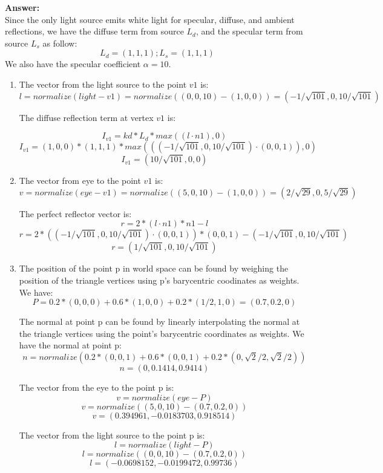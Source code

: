\documentclass[12pt]{letter}
\begin{document}
\begin{enumerate}
	\textbf{Answer:} \\
	Since the only light source emits white light for specular, diffuse, and ambient reflections, we have the diffuse term from source $L_d$, and the specular term from source $L_s$ as follow:
	$$ L_d = (1, 1, 1); L_s = (1, 1, 1) $$
	We also have the specular coefficient $\alpha = 10$.
	\begin{enumerate}
		\item
		The vector from the light source to the point $v1$ is:
		$$ l = normalize(light - v1) = normalize((0, 0, 10) - (1, 0, 0)) = (-1/\sqrt{101}, 0, 10/\sqrt{101})$$
		
		The diffuse reflection term at vertex $v1$ is:
		
		$$ I_{v1} = kd*L_d*max((l \cdot n1), 0)$$
		$$ I_{v1} = (1, 0, 0) * (1, 1, 1) * max(((-1/\sqrt{101}, 0, 10/\sqrt{101}) \cdot (0, 0, 1)), 0) $$
		$$ I_{v1} = (10/\sqrt{101}, 0, 0) $$
		
		\item
		The vector from eye to the point $v1$ is:
		$$ v = normalize(eye - v1) = normalize((5, 0, 10) - (1, 0, 0)) = (2/\sqrt{29}, 0, 5/\sqrt{29}) $$
		
		The perfect reflector vector is:
		$$ r = 2*(l \cdot n1)*n1 - l $$
		$$ r = 2*((-1/\sqrt{101}, 0, 10/\sqrt{101}) \cdot (0, 0, 1))*(0, 0, 1) - (-1/\sqrt{101}, 0, 10/\sqrt{101}) $$
		$$ r = (1/\sqrt{101}, 0, 10/\sqrt{101}) $$
		
		
		\item
	The position of the point p in world space can be found by weighing the position of the triangle vertices using p's barycentric coodinates as weights.
	We have:
	$$P = 0.2*(0, 0, 0) + 0.6*(1, 0, 0) + 0.2*(1/2, 1, 0) = (0.7, 0.2, 0)$$
	
	The normal at point p can be found by linearly interpolating the normal at the triangle vertices using the point's barycentric coordinates as weights.
	We have the normal at point p:
	$$ n = normalize(0.2*(0, 0, 1) + 0.6*(0, 0, 1) + 0.2*(0, \sqrt{2}/2, \sqrt{2}/2)) $$
	$$ n = (0, 0.1414, 0.9414)$$
	
	The vector from the eye to the point p is:
	$$ v = normalize(eye - P) $$
	$$ v = normalize((5, 0, 10) - (0.7, 0.2, 0)) $$
	$$ v = (0.394961, -0.0183703, 0.918514) $$
	
	The vector from the light source to the point p is:
	$$ l = normalize(light - P) $$
	$$ l = normalize((0, 0, 10) - (0.7, 0.2, 0)) $$
	$$ l= (-0.0698152, -0.0199472, 0.99736) $$
	
	\end{enumerate}
	

\end{enumerate}
\end{document}
